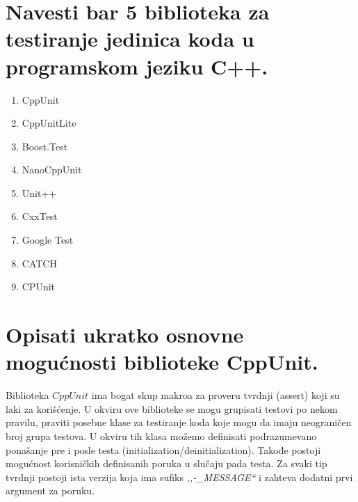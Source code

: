 \documentclass[a4paper]{article}
\begin{document}
\section{Navesti bar 5 biblioteka za testiranje jedinica koda u programskom jeziku C++.}
  \begin{enumerate}
    \item CppUnit
    \item CppUnitLite
    \item Boost.Test
    \item NanoCppUnit
    \item Unit++
    \item CxxTest
    \item Google Test
    \item CATCH
    \item CPUnit
  \end{enumerate}

\section{Opisati ukratko osnovne mogućnosti biblioteke CppUnit.}
  Biblioteka $CppUnit$ ima bogat skup makroa za proveru tvrdnji (assert) koji su laki za korišćenje.
  U okviru ove biblioteke se mogu grupisati testovi po nekom pravilu, praviti posebne klase
  za testiranje koda koje mogu da imaju neograničen broj grupa testova. U okviru tih klasa
  možemo definisati podrazumevano ponašanje pre i posle testa (initialization/deinitialization).
  Takođe postoji mogućnost korisničkih definisanih poruka u slučaju pada testa. Za svaki tip tvrdnji
  postoji ista verzija koja ima sufiks \textit{,,-\_MESSAGE``} i zahteva dodatni prvi argument za poruku. 
\end{document}
